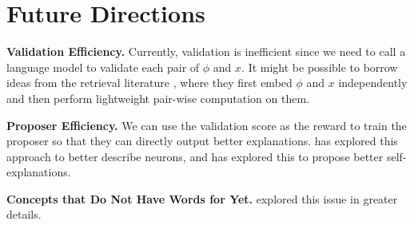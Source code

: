 \documentclass[12pt]{article}
\begin{document}
\section{Future Directions}

\noindent \textbf{Validation Efficiency.}
Currently, validation is inefficient since we need to call a language model to validate each pair of $\phi$ and $x$.
It might be possible to borrow ideas from the retrieval literature \cite{khattab2020colbert}, where they first embed $\phi$ and $x$ independently and then perform lightweight pair-wise computation on them.

\noindent \textbf{Proposer Efficiency.}
We can use the validation score as the reward to train the proposer so that they can directly output better explanations. 
\citet{choi2024automatic} has explored this approach to better describe neurons, and \citet{chen2024towards} has explored this to propose better self-explanations.

\noindent \textbf{Concepts that Do Not Have Words for Yet.}
\citet{hewitt2025we} explored this issue in greater details.







\pagebreak




\end{document}
